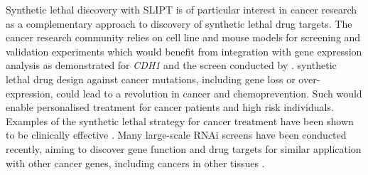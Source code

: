 Synthetic lethal discovery with \gls{SLIPT} is of particular interest in cancer research as a complementary approach to discovery of \gls{synthetic lethal} drug targets. The cancer research community relies on cell line and mouse models for screening and validation experiments \citep{Fece2015} which would benefit from integration with \gls{gene expression} analysis as demonstrated for \textit{CDH1} and the screen conducted by \citet{Telford2015}. \Gls{synthetic lethal} drug design against cancer \glspl{mutation}, including gene loss or over-expression, could lead to a revolution in cancer  and \gls{chemoprevention}. Such  would enable personalised treatment for cancer patients and high risk individuals.  Examples of the \gls{synthetic lethal} strategy \citep{Farmer2005, Bryant2005} for cancer treatment have been shown to be clinically effective \cite{McLachlan2016}. Many large-scale \gls{RNAi} screens have been conducted recently, aiming to discover gene function and drug targets for similar application with other cancer genes, including cancers in other tissues \citep{Fece2015}.



